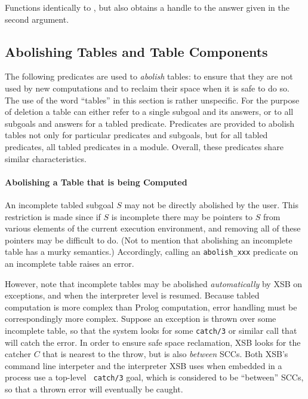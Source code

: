 \begin{description}
\begin{description}

%
Functions identically to , but also obtains a
handle to the answer given in the second argument.

\end{description}



\subsection{Abolishing Tables and Table Components}
\label{sec:TablePred:Deleting}

The following predicates are used to {\em abolish} tables: to ensure
that they are not used by new computations and to reclaim their space
when it is safe to do so.  The use of the word ``tables'' in this
section is rather unspecific.  For the purpose of deletion a table can
either refer to a single subgoal and its answers, or to all subgoals
and answers for a tabled predicate.  Predicates are provided to
abolish tables not only for particular predicates and subgoals, but
for all tabled predicates, all tabled predicates in a module.
Overall, these predicates share similar characteristics.

\paragraph{Abolishing a Table that is being Computed}
An incomplete tabled subgoal $S$ may not be directly abolished by the
user.  This restriction is made since if $S$ is incomplete there may
be pointers to $S$ from various elements of the current execution
environment, and removing all of these pointers may be difficult to
do. (Not to mention that abolishing an incomplete table has a murky
semantics.)  Accordingly, calling an {\tt abolish\_xxx} predicate on
an incomplete table raises an error.  

However, note that incomplete tables may be abolished
\emph{automatically} by XSB on exceptions, and when the interpreter
level is resumed.  Because tabled computation is more complex than
Prolog computation, error handling must be correspondingly more
complex.  Suppose an exception is thrown over some incomplete table,
so that the system looks for some {\tt catch/3} or similar call that
will catch the error.  In order to ensure safe space reclamation, XSB
looks for the catcher $C$ that is nearest to the throw, but is also
{\em between} SCCs.  Both XSB's command line interpeter and the
interpreter XSB uses when embedded in a process use a top-level {\tt
  catch/3} goal, which is considered to be ``between'' SCCs, so that a
thrown error will eventually be caught.


\end{description}
